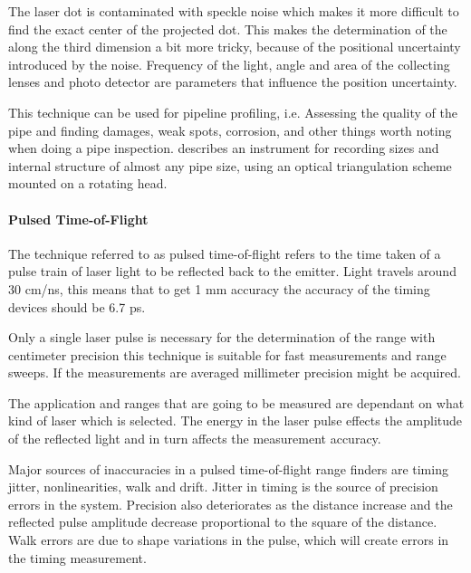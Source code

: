 The laser dot is contaminated with speckle noise which makes it more difficult to find the
exact center of the projected dot. This makes the determination of the along the third
dimension a bit more tricky, because of the positional uncertainty introduced by the
noise. Frequency of the light, angle and area of the collecting lenses and photo detector
are parameters that influence the position uncertainty. 

This technique can be used for pipeline profiling, i.e. Assessing the quality of the pipe
and finding damages, weak spots, corrosion, and other things worth noting when doing a pipe
inspection. \cite{optical-pipe-inspection} describes an instrument for recording sizes and
internal structure of almost any pipe size, using an optical triangulation scheme mounted
on a rotating head. 


\paragraph{Pulsed Time-of-Flight}
\label{chap2:subsec-lrf}
The technique referred to as pulsed time-of-flight refers to the time taken of a pulse
train of laser light to be reflected back to the emitter. Light travels around 30 cm/ns,
this means that to get 1 mm accuracy the accuracy of the timing devices should be
6.7 ps.

Only a single laser pulse is necessary for the determination of the range with centimeter
precision this technique is suitable for fast measurements and range sweeps. If the
measurements are averaged millimeter precision might be acquired. 

The application and ranges that are going to be measured are dependant on what kind of
laser which is selected. The energy in the laser pulse effects the amplitude of the
reflected light and in turn affects the measurement accuracy.

Major sources of inaccuracies in a pulsed time-of-flight range finders are timing jitter,
nonlinearities, walk and drift. Jitter in timing is the source of precision errors in the
system. Precision also deteriorates as the distance increase and the reflected pulse
amplitude decrease proportional to the square of the distance\cite{pulsed-tof}.
Walk errors are due to shape variations in the pulse, which will create errors in the
timing measurement. 






